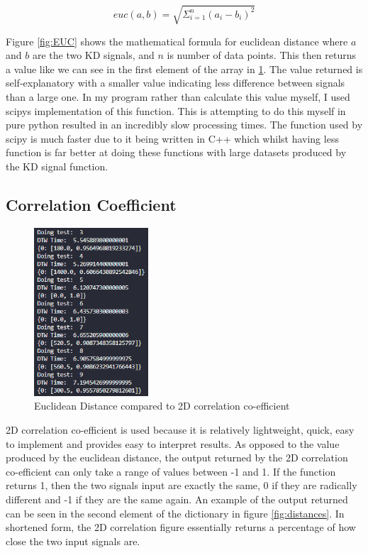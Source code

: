 \documentclass[10pt,a4paper]{report}
\begin{document}
\begin{equation}
\textit{euc}(a,b) = \sqrt{\Sigma^n_{i=1}(a_i-b_i)^2}
\label{fig:EUC}
\end{equation}

Figure \ref{fig:EUC} shows the mathematical formula for euclidean distance where \(a\) and \(b\) are the two KD signals, and \(n\) is number of data points. This then returns a value like we can see in the first element of the array in \ref{fig:VCompare}. The value returned is self-explanatory with a smaller value indicating less difference between signals than a large one. In my program rather than calculate this value myself, I used scipys implementation of this function\cite{scipycommunity_2022}. This is attempting to do this myself in pure python resulted in an incredibly slow processing times. The function used by scipy is much faster due to it being written in C++ which whilst having less function is far better at doing these functions with large datasets produced by the KD signal function.

\subsection{Correlation Coefficient}

\begin{figure}
	\begin{center}
		\includegraphics[width=0.38\textwidth]{EucVs2D}
	\end{center}
	\caption{Euclidean Distance compared to 2D correlation co-efficient}
	\label{fig:VCompare}
\end{figure}

2D correlation co-efficient is used because it is relatively lightweight, quick, easy to implement and provides easy to interpret results. As opposed to the value produced by the euclidean distance, the output returned by the 2D correlation co-efficient can only take a range of values between -1 and 1. If the function returns 1, then the two signals input are exactly the same, 0 if they are radically different and -1 if they are the same again. An example of the output returned can be seen in the second element of the dictionary in figure \ref{fig:distances}. In shortened form, the 2D correlation figure essentially returns a percentage of how close the two input signals are.
\end{document}
